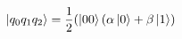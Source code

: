 \documentclass[preview]{standalone}
\begin{document}
\begin{align*}
\ket{q_0 q_1 q_2}= \frac{1}{2}( \ket{00}(\alpha \ket{0} + \beta \ket{1})
\end{align*}
\end{document}
